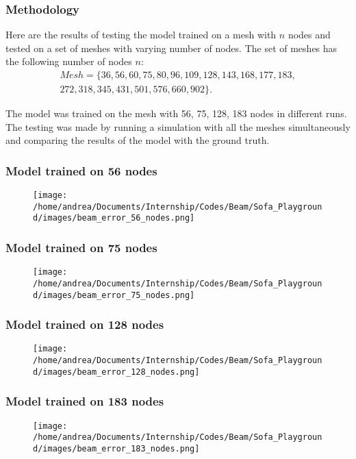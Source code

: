 \documentclass[10pt]{beamer}
\begin{document}
\begin{frame}
    \frametitle{Methodology}
    Here are the results of testing the model trained on a mesh with \(n\) nodes and tested on a set of meshes with varying number of nodes. The set of meshes has the following number of nodes \(n\):
    \[
        \begin{split}
            Mesh = \{36, 56, 60, 75, 80, 96, 109, 128, 143, 168, 177, 183,\\ 272, 318, 345, 431, 501, 576, 660, 902\}.
        \end{split}
    \]

    The model was trained on the mesh with 56, 75, 128, 183 nodes in different runs. The testing was made by running a simulation with all the meshes simultaneously and comparing the results of the model with the ground truth.
\end{frame}

\begin{frame}
    \frametitle{Model trained on 56 nodes}
    \begin{figure}
        \centering
        \texttt{[image: /home/andrea/Documents/Internship/Codes/Beam/Sofa\_Playground/images/beam\_error\_56\_nodes.png]}
    \end{figure}
\end{frame}

\begin{frame}
    \frametitle{Model trained on 75 nodes}
    \begin{figure}
        \centering
        \texttt{[image: /home/andrea/Documents/Internship/Codes/Beam/Sofa\_Playground/images/beam\_error\_75\_nodes.png]}
    \end{figure}

\end{frame}

\begin{frame}
    \frametitle{Model trained on 128 nodes}
    \begin{figure}
        \centering
        \texttt{[image: /home/andrea/Documents/Internship/Codes/Beam/Sofa\_Playground/images/beam\_error\_128\_nodes.png]}
    \end{figure}
\end{frame}

\begin{frame}
    \frametitle{Model trained on 183 nodes}
    \begin{figure}
        \centering
        \texttt{[image: /home/andrea/Documents/Internship/Codes/Beam/Sofa\_Playground/images/beam\_error\_183\_nodes.png]}
    \end{figure}
\end{frame}
\end{document}

